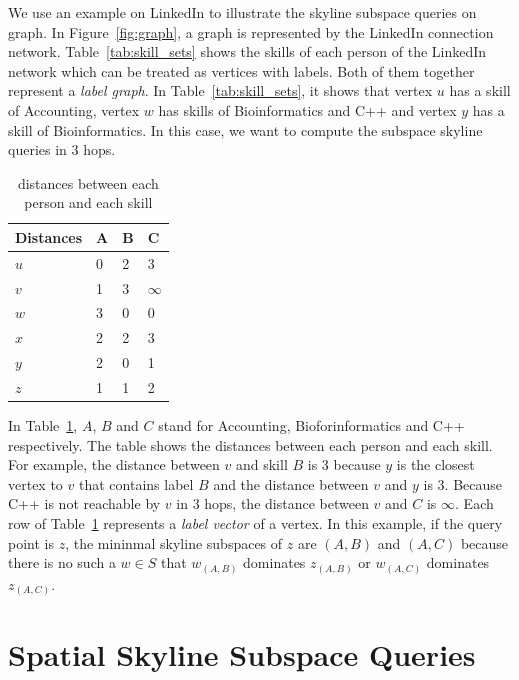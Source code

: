 We use an example on LinkedIn to illustrate the skyline subspace queries on graph. In Figure~\ref{fig:graph}, a graph is represented by the LinkedIn connection network. Table~\ref{tab:skill_sets} shows the skills of each person of the LinkedIn network which can be treated as vertices with labels. 
Both of them together represent a \emph{label graph}. In Table~\ref{tab:skill_sets}, it shows that vertex $u$ has a skill of Accounting, vertex $w$ has skills of Bioinformatics and C++ and vertex $y$ has a skill of Bioinformatics. In this case, we want to compute the subspace skyline queries in $3$ hops.

\begin{table}[h]
    \centering
    \begin{tabular}{llll}
    \hline
        Distances & A & B & C \\ \hline
        $u$       & 0 & 2 & 3 \\ \hline
        $v$       & 1 & 3 & $\infty$ \\ \hline
        $w$       & 3 & 0 & 0 \\ \hline
        $x$       & 2 & 2 & 3 \\ \hline
        $y$       & 2 & 0 & 1 \\ \hline
        $z$       & 1 & 1 & 2 \\ \hline
    \end{tabular}
    \caption{\label{font-table} distances between each person and each skill}
    \label{tab:distances_graph}
\end{table}

In Table~\ref{tab:distances_graph}, $A$, $B$ and $C$ stand for Accounting, Bioforinformatics and C++ respectively. The table shows the distances between each person and each skill. For example, the distance between $v$ and skill $B$ is $3$ because $y$ is the closest vertex to $v$ that contains label $B$ and the distance between $v$ and $y$ is $3$. Because C++ is not reachable by $v$ in $3$ hops, the distance between $v$ and $C$ is $\infty$. Each row of Table~\ref{tab:distances_graph} represents a \emph{label vector} of a vertex.
In this example, if the query point is $z$, the mininmal skyline subspaces of $z$ are $(A, B)$ and $(A, C)$ because there is no such a $w \in S$ that $w_{(A,B)}$ dominates $z_{(A,B)}$ or $w_{(A,C)}$ dominates $z_{(A,C)}$.


\section{Spatial Skyline Subspace Queries}

